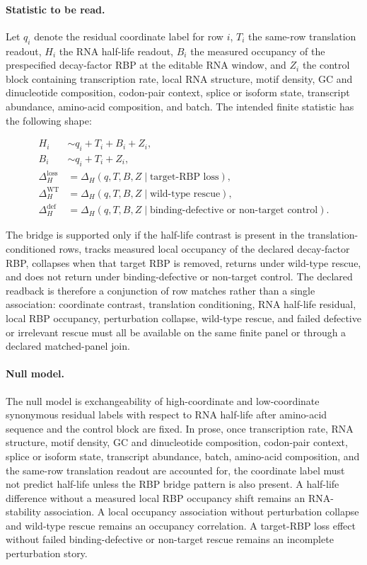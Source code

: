 \paragraph{Statistic to be read.}
Let $q_i$ denote the residual coordinate label for row $i$, $T_i$ the same-row translation readout, $H_i$ the RNA half-life readout, $B_i$ the measured occupancy of the prespecified decay-factor RBP at the editable RNA window, and $Z_i$ the control block containing transcription rate, local RNA structure, motif density, GC and dinucleotide composition, codon-pair context, splice or isoform state, transcript abundance, amino-acid composition, and batch. The intended finite statistic has the following shape:

$$
\begin{aligned}
H_i &\sim q_i + T_i + B_i + Z_i,\\
B_i &\sim q_i + T_i + Z_i,\\
\Delta_H^{\mathrm{loss}} &= \Delta_H(q,T,B,Z \mid \text{target-RBP loss}),\\
\Delta_H^{\mathrm{WT}} &= \Delta_H(q,T,B,Z \mid \text{wild-type rescue}),\\
\Delta_H^{\mathrm{def}} &= \Delta_H(q,T,B,Z \mid \text{binding-defective or non-target control}).
\end{aligned}
$$

The bridge is supported only if the half-life contrast is present in the translation-conditioned rows, tracks measured local occupancy of the declared decay-factor RBP, collapses when that target RBP is removed, returns under wild-type rescue, and does not return under binding-defective or non-target control. The declared readback is therefore a conjunction of row matches rather than a single association: coordinate contrast, translation conditioning, RNA half-life residual, local RBP occupancy, perturbation collapse, wild-type rescue, and failed defective or irrelevant rescue must all be available on the same finite panel or through a declared matched-panel join.

\paragraph{Null model.}
The null model is exchangeability of high-coordinate and low-coordinate synonymous residual labels with respect to RNA half-life after amino-acid sequence and the control block are fixed. In prose, once transcription rate, RNA structure, motif density, GC and dinucleotide composition, codon-pair context, splice or isoform state, transcript abundance, batch, amino-acid composition, and the same-row translation readout are accounted for, the coordinate label must not predict half-life unless the RBP bridge pattern is also present. A half-life difference without a measured local RBP occupancy shift remains an RNA-stability association. A local occupancy association without perturbation collapse and wild-type rescue remains an occupancy correlation. A target-RBP loss effect without failed binding-defective or non-target rescue remains an incomplete perturbation story.


